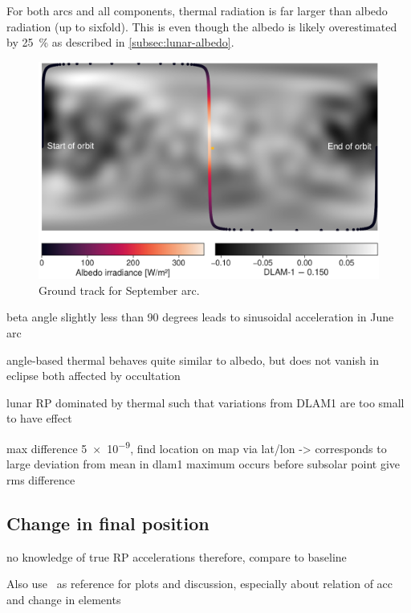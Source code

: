 For both arcs and all components, thermal radiation is far larger than albedo radiation (up to sixfold). This is even though the albedo is likely overestimated by \qty{25}{\percent} as described in \cref{subsec:lunar-albedo}.


\begin{figure}[t]
    \centering
    \includegraphics[width=\linewidth]{figures/plots/groundtrack.pdf}
    \caption{Ground track for September arc.}
    \label{fig:groundtrack}
\end{figure}


beta angle slightly less than 90 degrees leads to sinusoidal acceleration in June arc

angle-based thermal behaves quite similar to albedo, but does not vanish in eclipse
both affected by occultation


lunar RP dominated by thermal such that variations from DLAM1 are too small to have effect

max difference \qty{5e-9}{\acc}, find location on map via lat/lon -> corresponds to large deviation from mean in dlam1
maximum occurs before subsolar point
give rms difference








\subsection{Change in final position}

no knowledge of true RP accelerations
therefore, compare to baseline

Also use~\cite{Borderies1990} as reference for plots and discussion, especially about relation of acc and change in elements

